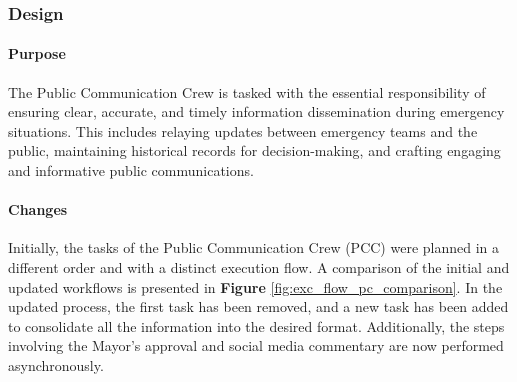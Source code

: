 \subsubsection{Design}
\paragraph{Purpose}
The Public Communication Crew is tasked with the essential responsibility of ensuring clear, accurate, and timely information dissemination during emergency situations. This includes relaying updates between emergency teams and the public, maintaining historical records for decision-making, and crafting engaging and informative public communications.

\paragraph{Changes}
Initially, the tasks of the Public Communication Crew (PCC) were planned in a different order and with a distinct execution flow. A comparison of the initial and updated workflows is presented in \textbf{Figure} \ref{fig:exc_flow_pc_comparison}. In the updated process, the first task has been removed, and a new task has been added to consolidate all the information into the desired format. Additionally, the steps involving the Mayor's approval and social media commentary are now performed asynchronously.

